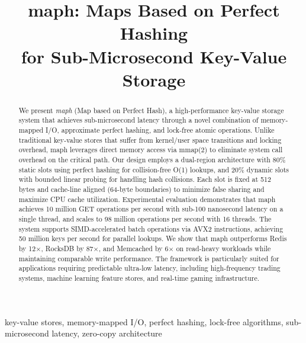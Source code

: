 \documentclass[10pt,conference]{IEEEtran}
\begin{document}
\title{maph: Maps Based on Perfect Hashing\\for Sub-Microsecond Key-Value Storage}

\author{
}

\maketitle

\begin{abstract}
We present \textit{maph} (Map based on Perfect Hash), a high-performance key-value storage system that achieves sub-microsecond latency through a novel combination of memory-mapped I/O, approximate perfect hashing, and lock-free atomic operations. Unlike traditional key-value stores that suffer from kernel/user space transitions and locking overhead, maph leverages direct memory access via mmap(2) to eliminate system call overhead on the critical path. Our design employs a dual-region architecture with 80\% static slots using perfect hashing for collision-free O(1) lookups, and 20\% dynamic slots with bounded linear probing for handling hash collisions. Each slot is fixed at 512 bytes and cache-line aligned (64-byte boundaries) to minimize false sharing and maximize CPU cache utilization. Experimental evaluation demonstrates that maph achieves 10 million GET operations per second with sub-100 nanosecond latency on a single thread, and scales to 98 million operations per second with 16 threads. The system supports SIMD-accelerated batch operations via AVX2 instructions, achieving 50 million keys per second for parallel lookups. We show that maph outperforms Redis by 12$\times$, RocksDB by 87$\times$, and Memcached by 6$\times$ on read-heavy workloads while maintaining comparable write performance. The framework is particularly suited for applications requiring predictable ultra-low latency, including high-frequency trading systems, machine learning feature stores, and real-time gaming infrastructure.
\end{abstract}

\begin{IEEEkeywords}
key-value stores, memory-mapped I/O, perfect hashing, lock-free algorithms, sub-microsecond latency, zero-copy architecture
\end{IEEEkeywords}
\end{document}
